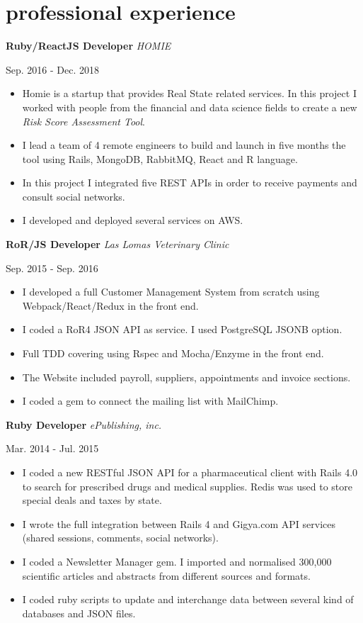 \documentclass[]{k-cv}
\begin{document}
\newpage

\section{professional experience}

  \textbf{Ruby/ReactJS Developer}  \textit{HOMIE}
  {\color{gray} {\small Sep. 2016 - Dec. 2018 \par}}
  \begin{itemize}
    \item Homie is a startup that provides Real State related services. In this project I
          worked with people from the financial and data science fields to create a new
          \textit{Risk Score Assessment Tool}.
    \item I lead a team of 4 remote engineers to build and launch in five months the tool
          using Rails, MongoDB, RabbitMQ, React and R language.
    \item In this project I integrated five REST APIs in order to receive payments and consult social networks.
    \item I developed and deployed several services on AWS.
  \end{itemize}

   \textbf{RoR/JS Developer} \textit{Las Lomas Veterinary Clinic}
   {\color{gray} {\small Sep. 2015 - Sep. 2016 \par}}
   \begin{itemize}
     \item I developed a full Customer Management System from scratch using Webpack/React/Redux in the front end.
     \item I coded a RoR4 JSON API as service. I used PostgreSQL JSONB option.
     \item Full TDD covering using Rspec and Mocha/Enzyme in the front end.
     \item The Website included payroll, suppliers, appointments and invoice sections.
     \item I coded a gem to connect the mailing list with MailChimp.
   \end{itemize}

  \textbf{Ruby Developer}  \textit{ePublishing, inc.}
  {\color{gray} {\small Mar. 2014 - Jul. 2015 \par}}
   \begin{itemize}
     \item I coded a new RESTful JSON API for a pharmaceutical client with Rails 4.0 to
           search for prescribed drugs and medical supplies. Redis was used to store
           special deals and taxes by state.
     \item I wrote the full integration between Rails 4 and Gigya.com API services (shared
           sessions, comments, social networks).
     \item I coded a Newsletter Manager gem. I imported and normalised 300,000
           scientific articles and abstracts from different sources and formats.
     \item I coded ruby scripts to update and interchange data between several kind of
           databases and JSON files.
  \end{itemize}
\end{document}
